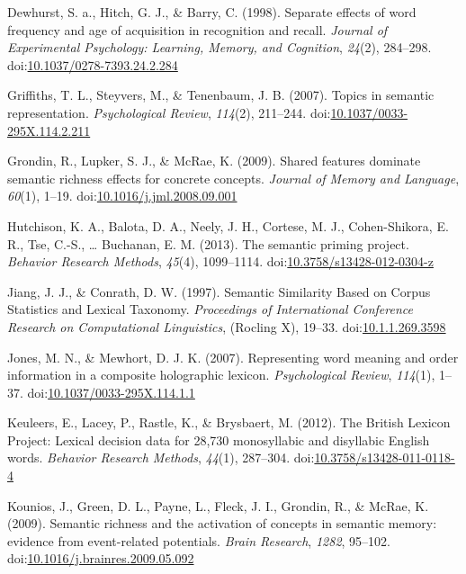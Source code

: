 \documentclass[english,man]{apa6}
\theoremstyle{definition}
\theoremstyle{definition}
\theoremstyle{definition}
\theoremstyle{remark}
\begin{document}
\hypertarget{ref-Dewhurst1998}{}
Dewhurst, S. a., Hitch, G. J., \& Barry, C. (1998). Separate effects of
word frequency and age of acquisition in recognition and recall.
\emph{Journal of Experimental Psychology: Learning, Memory, and
Cognition}, \emph{24}(2), 284--298.
doi:\href{https://doi.org/10.1037/0278-7393.24.2.284}{10.1037/0278-7393.24.2.284}

\hypertarget{ref-Griffiths2007}{}
Griffiths, T. L., Steyvers, M., \& Tenenbaum, J. B. (2007). Topics in
semantic representation. \emph{Psychological Review}, \emph{114}(2),
211--244.
doi:\href{https://doi.org/10.1037/0033-295X.114.2.211}{10.1037/0033-295X.114.2.211}

\hypertarget{ref-Grondin2009}{}
Grondin, R., Lupker, S. J., \& McRae, K. (2009). Shared features
dominate semantic richness effects for concrete concepts. \emph{Journal
of Memory and Language}, \emph{60}(1), 1--19.
doi:\href{https://doi.org/10.1016/j.jml.2008.09.001}{10.1016/j.jml.2008.09.001}

\hypertarget{ref-Hutchison2013}{}
Hutchison, K. A., Balota, D. A., Neely, J. H., Cortese, M. J.,
Cohen-Shikora, E. R., Tse, C.-S., \ldots{} Buchanan, E. M. (2013). The
semantic priming project. \emph{Behavior Research Methods},
\emph{45}(4), 1099--1114.
doi:\href{https://doi.org/10.3758/s13428-012-0304-z}{10.3758/s13428-012-0304-z}

\hypertarget{ref-Jiang1997}{}
Jiang, J. J., \& Conrath, D. W. (1997). Semantic Similarity Based on
Corpus Statistics and Lexical Taxonomy. \emph{Proceedings of
International Conference Research on Computational Linguistics},
(Rocling X), 19--33.
doi:\href{https://doi.org/10.1.1.269.3598}{10.1.1.269.3598}

\hypertarget{ref-Jones2007}{}
Jones, M. N., \& Mewhort, D. J. K. (2007). Representing word meaning and
order information in a composite holographic lexicon.
\emph{Psychological Review}, \emph{114}(1), 1--37.
doi:\href{https://doi.org/10.1037/0033-295X.114.1.1}{10.1037/0033-295X.114.1.1}

\hypertarget{ref-Keuleers2012}{}
Keuleers, E., Lacey, P., Rastle, K., \& Brysbaert, M. (2012). The
British Lexicon Project: Lexical decision data for 28,730 monosyllabic
and disyllabic English words. \emph{Behavior Research Methods},
\emph{44}(1), 287--304.
doi:\href{https://doi.org/10.3758/s13428-011-0118-4}{10.3758/s13428-011-0118-4}

\hypertarget{ref-Kounios2009}{}
Kounios, J., Green, D. L., Payne, L., Fleck, J. I., Grondin, R., \&
McRae, K. (2009). Semantic richness and the activation of concepts in
semantic memory: evidence from event-related potentials. \emph{Brain
Research}, \emph{1282}, 95--102.
doi:\href{https://doi.org/10.1016/j.brainres.2009.05.092}{10.1016/j.brainres.2009.05.092}
\end{document}
